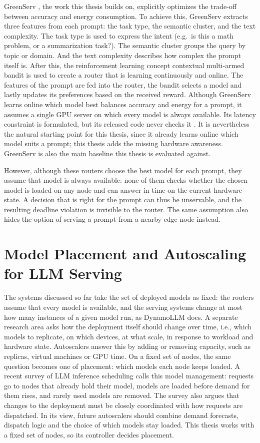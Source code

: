 GreenServ \cite{greenserv}, the work this thesis builds on, explicitly optimizes the trade-off between accuracy and energy consumption.
To achieve this, GreenServ extracts three features from each prompt: the task type, the semantic cluster, and the text complexity.
The task type is used to express the intent (e.g.\ is this a math problem, or a summarization task?).
The semantic cluster groups the query by topic or domain.
And the text complexity describes how complex the prompt itself is.
After this, the reinforcement learning concept contextual multi-armed bandit is used to create a router that is learning continuously and online.
The features of the prompt are fed into the router, the bandit selects a model and lastly updates its preferences based on the received reward.
Although GreenServ learns online which model best balances accuracy and energy for a prompt, it assumes a single GPU server on which every model is always available.
Its latency constraint is formulated, but its released code never checks it \cite{greenserv_code}.
It is nevertheless the natural starting point for this thesis, since it already learns online which model suits a prompt; this thesis adds the missing hardware awareness.
GreenServ is also the main baseline this thesis is evaluated against.

However, although these routers choose the best model for each prompt, they assume that model is always available: none of them checks whether the chosen model is loaded on any node and can answer in time on the current hardware state.
A decision that is right for the prompt can thus be unservable, and the resulting deadline violation is invisible to the router.
The same assumption also hides the option of serving a prompt from a nearby edge node instead.


\section{Model Placement and Autoscaling for LLM Serving}

The systems discussed so far take the set of deployed models as fixed: the routers assume that every model is available, and the serving systems change at most how many instances of a given model run, as DynamoLLM does.
A separate research area asks how the deployment itself should change over time, i.e., which models to replicate, on which devices, at what scale, in response to workload and hardware state.
Autoscalers answer this by adding or removing capacity, such as replicas, virtual machines or GPU time.
On a fixed set of nodes, the same question becomes one of placement: which models each node keeps loaded.
A recent survey of LLM inference scheduling \cite{llm_serving_survey} calls this model management: requests go to nodes that already hold their model, models are loaded before demand for them rises, and rarely used models are removed.
The survey also argues that changes to the deployment must be closely coordinated with how requests are dispatched.
In its view, future autoscalers should combine demand forecasts, dispatch logic and the choice of which models stay loaded.
This thesis works with a fixed set of nodes, so its controller decides placement.


